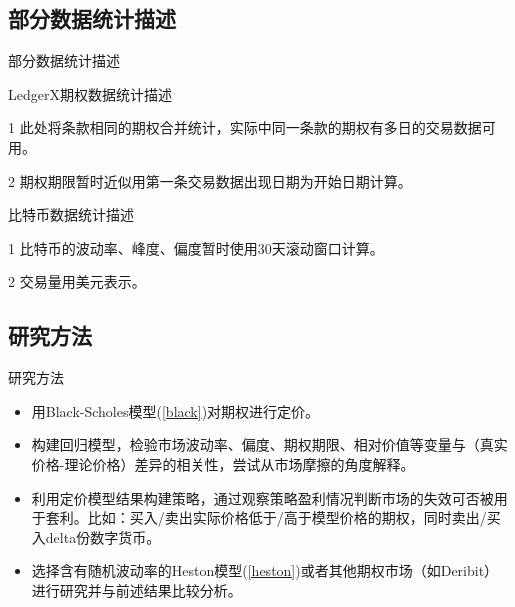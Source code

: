 \documentclass[11pt,dark]{mathbeamer}
\begin{document}
\subsection{部分数据统计描述}
\begin{frame}[allowframebreaks]{部分数据统计描述}

\begin{table}
  \tiny
  \caption{LedgerX期权数据统计描述}
  \begin{threeparttable}
    
  \begin{tablenotes}
    \tiny
    \item[1] 此处将条款相同的期权合并统计，实际中同一条款的期权有多日的交易数据可用。
    \item[2] 期权期限暂时近似用第一条交易数据出现日期为开始日期计算。
  \end{tablenotes}
  \end{threeparttable}
  
\end{table}
\begin{table}
  \tiny
  \caption{比特币数据统计描述}
  \begin{threeparttable}
    
  \begin{tablenotes}
    \tiny
    \item[1] 比特币的波动率、峰度、偏度暂时使用30天滚动窗口计算。
    \item[2] 交易量用美元表示。
  \end{tablenotes}
  \end{threeparttable}
  
\end{table}
\end{frame}

\subsection{研究方法}
\begin{frame}{研究方法}
  \begin{itemize}
    \item 用Black-Scholes模型(\ref{black})对期权进行定价。
    \item 构建回归模型，检验市场波动率、偏度、期权期限、相对价值等变量与（真实价格-理论价格）差异的相关性，尝试从市场摩擦的角度解释。
    \item 利用定价模型结果构建策略，通过观察策略盈利情况判断市场的失效可否被用于套利。比如：买入/卖出实际价格低于/高于模型价格的期权，同时卖出/买入delta份数字货币。
    \item 选择含有随机波动率的Heston模型(\ref{heston})或者其他期权市场（如Deribit）进行研究并与前述结果比较分析。
  \end{itemize}
\end{frame}
\end{document}
